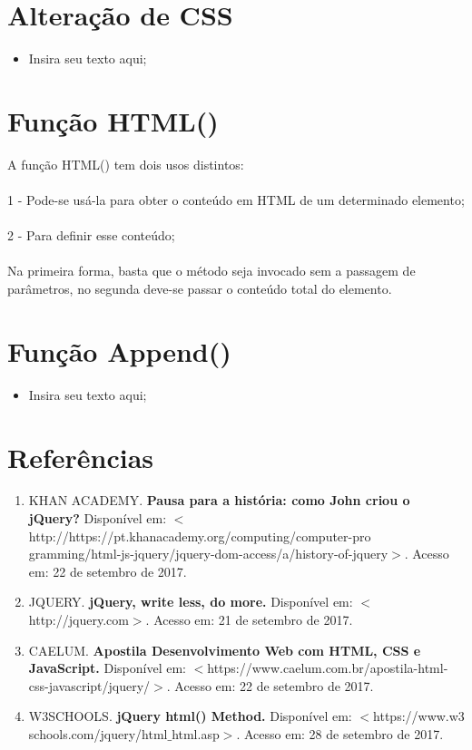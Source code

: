 \documentclass[12pt,a4paper]{article}
\begin{document}
\section{Alteração de CSS}%
\begin{itemize}

\item Insira seu texto aqui;
\end{itemize}

\section{Função HTML()}%

\item A função HTML() tem dois usos distintos:
\\
\\
1 - Pode-se usá-la para obter o conteúdo em HTML de um determinado elemento;
\\
\\
2 - Para definir esse conteúdo;
\\
\\
Na primeira forma, basta que o método seja invocado sem a passagem de parâmetros, no segunda deve-se passar o conteúdo total do elemento.

\section{Função Append()}%
\begin{itemize}

\item Insira seu texto aqui;
\end{itemize}


\section{Referências}
\begin{enumerate}

\item KHAN ACADEMY. \textbf{Pausa para a história: como John criou o jQuery?} Disponível em: $<$http://https://pt.khanacademy.org/computing/computer-pro
gramming/html-js-jquery/jquery-dom-access/a/history-of-jquery$>$. Acesso em: 22 de setembro de 2017.

\item JQUERY. \textbf{jQuery, write less, do more.} Disponível em: $<$http://jquery.com$>$. Acesso em: 21 de setembro de 2017.

\item CAELUM. \textbf{Apostila Desenvolvimento Web com HTML, CSS e JavaScript.} Disponível em: $<$https://www.caelum.com.br/apostila-html-css-javascript/jquery/$>$. Acesso em: 22 de setembro de 2017.

\item W3SCHOOLS. \textbf{jQuery html() Method.} Disponível em: $<$https://www.w3
schools.com/jquery/html$\_$html.asp$>$. Acesso em: 28 de setembro de 2017.

\end{enumerate}
\end{document}
